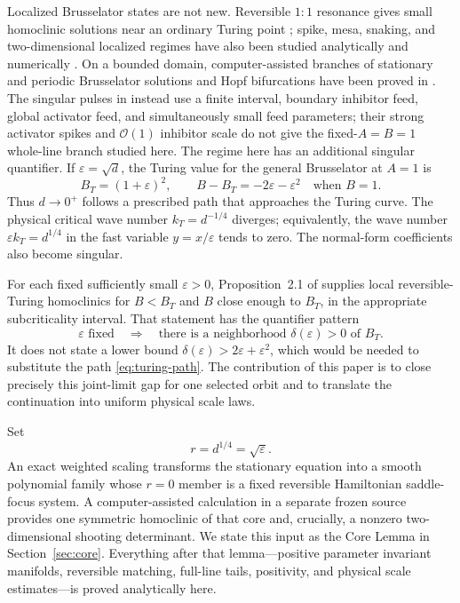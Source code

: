 \documentclass[11pt,reqno]{amsart}
\numberwithin{equation}{section}
\theoremstyle{remark}
\newcommand{\cO}{\mathcal O}
\begin{document}
Localized Brusselator states are not new.  Reversible $1{:}1$ resonance gives
small homoclinic solutions near an ordinary Turing point
\cite{IoossPeroueme1993,GlebskyLerman1997}; spike, mesa, snaking, and
two-dimensional localized regimes have also been studied analytically and
numerically
\cite{TzouEtAl2011,TzouNecWard2013,KolokolnikovErneuxWei2006,AlSaadiEtAl2021,VillarChampneys2023,KostetEtAl2018}.
On a bounded domain, computer-assisted branches of stationary and periodic
Brusselator solutions and Hopf bifurcations have been proved in
\cite{Arioli2022}.
The singular pulses in \cite{TzouEtAl2011} instead use a finite interval,
boundary inhibitor feed, global activator feed, and simultaneously small feed
parameters; their strong activator spikes and $\cO(1)$ inhibitor scale do not
give the fixed-$A=B=1$ whole-line branch studied here.
The regime here has an additional singular quantifier.  If
$\varepsilon=\sqrt d$, the Turing value for the general Brusselator at
$A=1$ is
\begin{equation}\label{eq:turing-path}
 B_T=(1+\varepsilon)^2,
 \qquad B-B_T=-2\varepsilon-\varepsilon^2
 \quad\text{when }B=1.
\end{equation}
Thus $d\to0^+$ follows a prescribed path that approaches the Turing curve.
The physical critical wave number $k_T=d^{-1/4}$ diverges; equivalently, the
wave number $\varepsilon k_T=d^{1/4}$ in the fast variable $y=x/\varepsilon$
tends to zero.  The normal-form coefficients also become singular.

For each fixed sufficiently small $\varepsilon>0$, Proposition~2.1 of
\cite{JencksEtAl2026} supplies local reversible-Turing homoclinics for $B<B_T$
and $B$ close enough to $B_T$, in the appropriate subcriticality interval.
That statement has the quantifier pattern
\[
 \text{$\varepsilon$ fixed}\quad\Longrightarrow\quad
 \text{there is a neighborhood $\delta(\varepsilon)>0$ of $B_T$}.
\]
It does not state a lower bound
$\delta(\varepsilon)>2\varepsilon+\varepsilon^2$, which would be needed to
substitute the path \eqref{eq:turing-path}.  The contribution of this paper
is to close precisely this joint-limit gap for one selected orbit and to
translate the continuation into uniform physical scale laws.

Set
\begin{equation}\label{eq:r-def}
 r=d^{1/4}=\sqrt\varepsilon.
\end{equation}
An exact weighted scaling transforms the stationary equation into a smooth
polynomial family whose $r=0$ member is a fixed reversible Hamiltonian
saddle-focus system.  A computer-assisted calculation in a separate frozen
source provides one symmetric homoclinic of that core and, crucially, a
nonzero two-dimensional shooting determinant.  We state this input as the
Core Lemma in Section~\ref{sec:core}.  Everything after that lemma---positive
parameter invariant manifolds, reversible matching, full-line tails,
positivity, and physical scale estimates---is proved analytically here.
\end{document}
